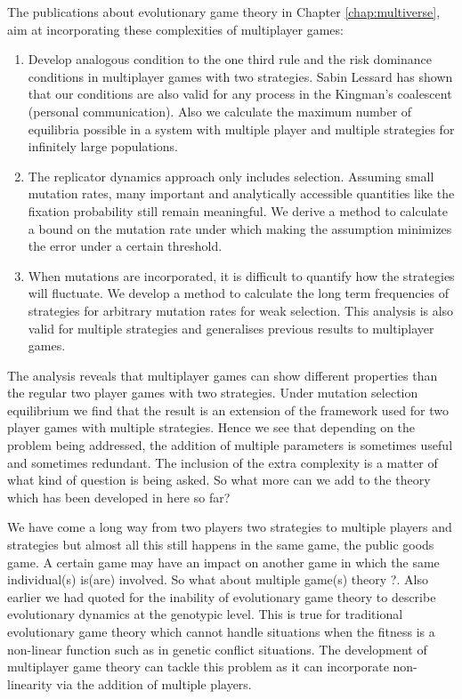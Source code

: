 \documentclass[oneside,11pt,a4paper]{book}
\begin{document}
\noindent
The publications about evolutionary game theory in Chapter \ref{chap:multiverse}, aim at incorporating these complexities of multiplayer games:
\begin{enumerate}
\item Develop analogous condition to the one third rule and the risk dominance conditions in multiplayer games with two strategies.
Sabin Lessard has shown that our conditions are also valid for any process in the Kingman's coalescent (personal communication).
Also we calculate the maximum number of equilibria possible in a system with multiple player and multiple strategies for infinitely large populations.

\item The replicator dynamics approach only includes selection.
Assuming small mutation rates, many important and analytically accessible quantities like the fixation probability still remain meaningful.
We derive a method to calculate a bound on the mutation rate under which making the assumption minimizes the error under a certain threshold.

\item When mutations are incorporated, it is difficult to quantify how the strategies will fluctuate.
We develop a method to calculate the long term frequencies of strategies for arbitrary mutation rates for weak selection.
This analysis is also valid for multiple strategies and generalises previous results to multiplayer games.

\end{enumerate}
The analysis reveals that multiplayer games can show different properties than the regular two player games with two strategies.
Under mutation selection equilibrium we find that the result is an extension of the framework used for two player games with multiple strategies.
Hence we see that depending on the problem being addressed, the addition of multiple parameters is sometimes useful and sometimes redundant.
The inclusion of the extra complexity is a matter of what kind of question is being asked.
So what more can we add to the theory which has been developed in here so far?

We have come a long way from two players two strategies to multiple players and strategies but almost all this still happens in the same game, the public goods game.
A certain game may have an impact on another game in which the same individual(s) is(are) involved.
So what about multiple game(s) theory \citep{bednar:2007mg}?.
Also earlier we had quoted \citet{nowak:2004aa} for the inability of evolutionary game theory to describe evolutionary dynamics at the genotypic level.
This is true for traditional evolutionary game theory which cannot handle situations when the fitness is a non-linear function such as in genetic conflict situations.
The development of multiplayer game theory can tackle this problem as it can incorporate non-linearity via the addition of multiple players.
\end{document}
